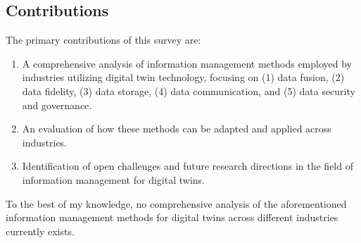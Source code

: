 \documentclass[conference]{IEEEtran}
\begin{document}
\subsection{Contributions}

The primary contributions of this survey are:
\begin{enumerate}
    \item A comprehensive analysis of information management methods employed by industries utilizing digital twin technology, focusing on (1) data fusion, (2) data fidelity, (3) data storage, (4) data communication, and (5) data security and governance.
    \item An evaluation of how these methods can be adapted and applied across industries.
    \item Identification of open challenges and future research directions in the field of information management for digital twins.
\end{enumerate}

To the best of my knowledge, no comprehensive analysis of the aforementioned information management methods for digital twins across different industries currently exists.



\end{document}
